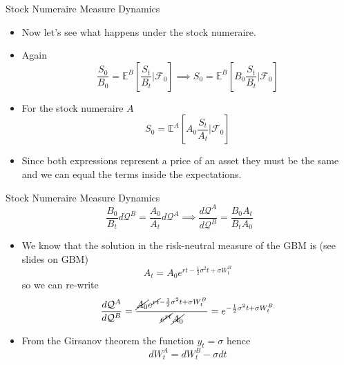 \documentclass{beamer}
\begin{document}
\begin{frame}{Stock Numeraire Measure Dynamics}
	\begin{itemize}
	\item Now let's see what happens under the stock numeraire.
	\item Again 
	\begin{equation*}
	\frac{S_0}{B_0} = \mathbb{E}^B\left[\frac{S_t}{B_t}\bigg|\mathcal{F}_0\right] \implies
	S_0 = \mathbb{E}^B\left[B_0\frac{S_t}{B_t}\bigg|\mathcal{F}_0\right]
	\end{equation*}
	\item For the stock numeraire $A$
	\begin{equation*}
	S_0 = \mathbb{E}^A\left[A_0\frac{S_t}{A_t}\bigg|\mathcal{F}_0\right]
	\end{equation*}
	\item Since both expressions represent a price of an asset they must be the same and we can equal the terms inside the expectations.
\end{itemize}
\end{frame}

\begin{frame}{Stock Numeraire Measure Dynamics}
	\begin{equation*}
	\frac{B_0}{B_t}d\mathcal{Q}^B = \frac{A_0}{A_t}d\mathcal{Q}^A\implies \frac{d\mathcal{Q}^A}{d\mathcal{Q}^B}=\frac{B_0A_t}{B_tA_0}
	\end{equation*}
	\begin{itemize}
	\item We know that the solution in the risk-neutral measure of the GBM is (see slides on GBM)
	\begin{equation*} 
	A_t = A_0 e^{rt-\frac{1}{2}\sigma^2 t + \sigma W^B_t}
	\end{equation*}
	so we can re-write
	\begin{equation*}
	\frac{d\mathcal{Q}^A}{d\mathcal{Q}^B}=\frac{\cancel{A_0}e^{\cancel{rt}-\frac{1}{2}\sigma^2 t + \sigma W^B_t}}{\cancel{e^{rt}}\cancel{A_0}}=e^{-\frac{1}{2}\sigma^2 t + \sigma W^B_t}
	\end{equation*}
	\item From the Girsanov theorem the function $y_t = \sigma$ hence
	\begin{equation*}
	dW_t^A = dW_t^B - \sigma dt 
	\end{equation*}
\end{itemize}
\end{frame}
\end{document}
